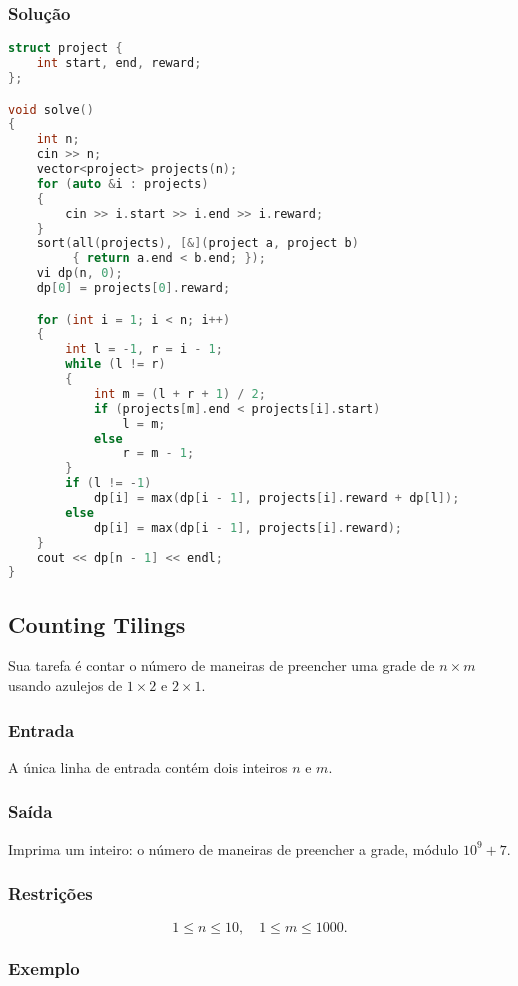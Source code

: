 \subsubsection*{Solução}
\begin{lstlisting}[language=C++]
struct project {
    int start, end, reward;
};

void solve()
{
    int n;
    cin >> n;
    vector<project> projects(n);
    for (auto &i : projects)
    {
        cin >> i.start >> i.end >> i.reward;
    }
    sort(all(projects), [&](project a, project b)
         { return a.end < b.end; });
    vi dp(n, 0);
    dp[0] = projects[0].reward;

    for (int i = 1; i < n; i++)
    {
        int l = -1, r = i - 1;
        while (l != r)
        {
            int m = (l + r + 1) / 2;
            if (projects[m].end < projects[i].start)
                l = m;
            else
                r = m - 1;
        }
        if (l != -1)
            dp[i] = max(dp[i - 1], projects[i].reward + dp[l]);
        else
            dp[i] = max(dp[i - 1], projects[i].reward);
    }
    cout << dp[n - 1] << endl;
}
\end{lstlisting}
\subsection{Counting Tilings}
Sua tarefa é contar o número de maneiras de preencher uma grade de \( n \times m \) usando azulejos de \(1 \times 2\) e \(2 \times 1\).

\subsubsection*{Entrada}
A única linha de entrada contém dois inteiros \( n \) e \( m \).

\subsubsection*{Saída}
Imprima um inteiro: o número de maneiras de preencher a grade, módulo \(10^9+7\).

\subsubsection*{Restrições}
\[
1 \le n \le 10,\quad 1 \le m \le 1000.
\]

\subsubsection*{Exemplo}

